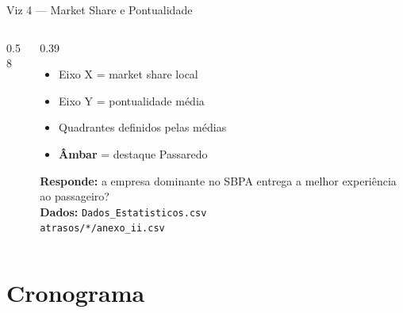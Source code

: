 \documentclass[aspectratio=169]{beamer}
\begin{document}
\begin{frame}[t]{Viz 4 --- Market Share e Pontualidade}
\begin{columns}[c]
\begin{column}{0.58\textwidth}
    \end{column}
    \begin{column}{0.39\textwidth}
      \begin{itemize}\setlength{\itemsep}{7pt}
        \item Eixo X = market share local
        \item Eixo Y = pontualidade média
        \item Quadrantes definidos pelas médias
        \item \textcolor{passaredoamber}{\textbf{Âmbar}} = destaque Passaredo
      \end{itemize}
      \medskip
      \textbf{Responde:} a empresa dominante no SBPA entrega a melhor experiência ao passageiro?
      \medskip\\
      \footnotesize\textbf{Dados:} \texttt{Dados\_Estatisticos.csv}\\
      \texttt{atrasos/*/anexo\_ii.csv}
    \end{column}
  \end{columns}
\end{frame}

\section{Cronograma}
\end{document}
